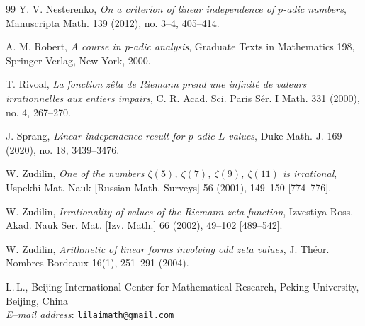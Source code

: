 \documentclass[12pt]{article}
\numberwithin{equation}{section}
\begin{document}
\begin{thebibliography}{99}
 Y. V. Nesterenko, \textit{On a criterion of linear independence of $p$-adic numbers}, Manuscripta Math. 139 (2012), no. 3--4, 405--414.

 A. M. Robert, \textit{A course in p-adic analysis}, Graduate Texts in Mathematics 198, Springer-Verlag, New York, 2000.

 T. Rivoal, \textit{La fonction z{\^e}ta de Riemann prend une infinit{\'e} de valeurs irrationnelles aux entiers impairs},  C. R. Acad. Sci. Paris S{\'e}r. I Math. 331 (2000), no. 4, 267--270.

 J. Sprang, \textit{Linear independence result for $p$-adic $L$-values}, Duke Math. J. 169 (2020), no. 18, 3439--3476.

 W. Zudilin, \textit{One of the numbers $\zeta(5)$, $\zeta(7)$, $\zeta(9)$, $\zeta(11)$ is irrational}, Uspekhi Mat. Nauk [Russian Math. Surveys] 56 (2001), 149--150 [774--776].

 W. Zudilin, \textit{Irrationality of values of the Riemann zeta function}, Izvestiya Ross. Akad. Nauk Ser. Mat. [Izv. Math.] 66 (2002), 49--102 [489--542].

 W. Zudilin, \textit{Arithmetic of linear forms involving odd zeta values}, J. Th{\'e}or. Nombres Bordeaux 16(1), 251--291 (2004).
\end{thebibliography}

\vspace*{3mm}
\begin{flushright}
\begin{minipage}{148mm}\sc\footnotesize
L.\,L., Beijing International Center for Mathematical Research, Peking University, Beijing, China\\
{\it E--mail address}: {\tt lilaimath@gmail.com} \vspace*{3mm}
\end{minipage}
\end{flushright}
\end{document}

